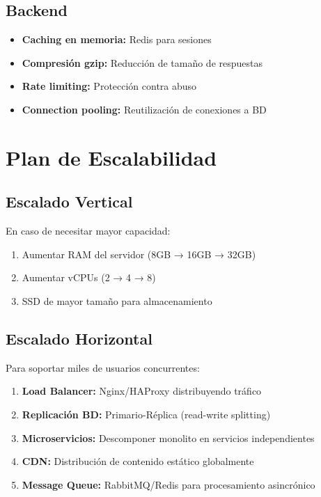 \documentclass[a4paper]{report}
\begin{document}
\subsection{Backend}

\begin{itemize}
  \item \textbf{Caching en memoria:} Redis para sesiones
  \item \textbf{Compresión gzip:} Reducción de tamaño de respuestas
  \item \textbf{Rate limiting:} Protección contra abuso
  \item \textbf{Connection pooling:} Reutilización de conexiones a BD
\end{itemize}

\section{Plan de Escalabilidad}

\subsection{Escalado Vertical}

En caso de necesitar mayor capacidad:

\begin{enumerate}
  \item Aumentar RAM del servidor (8GB → 16GB → 32GB)
  \item Aumentar vCPUs (2 → 4 → 8)
  \item SSD de mayor tamaño para almacenamiento
\end{enumerate}

\subsection{Escalado Horizontal}

Para soportar miles de usuarios concurrentes:

\begin{enumerate}
  \item \textbf{Load Balancer:} Nginx/HAProxy distribuyendo tráfico
  \item \textbf{Replicación BD:} Primario-Réplica (read-write splitting)
  \item \textbf{Microservicios:} Descomponer monolito en servicios independientes
  \item \textbf{CDN:} Distribución de contenido estático globalmente
  \item \textbf{Message Queue:} RabbitMQ/Redis para procesamiento asincrónico
\end{enumerate}
\end{document}
